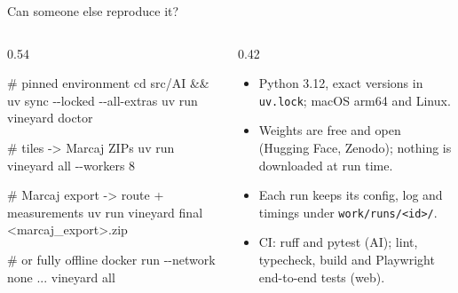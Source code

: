 \begin{frame}[fragile]{Can someone else reproduce it?}
  \begin{columns}[T]
    \begin{column}{0.54\textwidth}
\begin{semiverbatim}\scriptsize
\textcolor{sxGrey}{# pinned environment}
cd src/AI && uv sync -{}-locked -{}-all-extras
uv run vineyard doctor

\textcolor{sxGrey}{# tiles -> Marcaj ZIPs}
uv run vineyard all -{}-workers 8

\textcolor{sxGrey}{# Marcaj export -> route + measurements}
uv run vineyard final <marcaj_export>.zip

\textcolor{sxGrey}{# or fully offline}
docker run -{}-network none ... vineyard all
\end{semiverbatim}
    \end{column}
    \begin{column}{0.42\textwidth}
      \footnotesize
      \begin{itemize}\setlength{\itemsep}{1.2mm}
        \item Python 3.12, exact versions in \texttt{uv.lock}; macOS arm64 and Linux.
        \item Weights are free and open (Hugging Face, Zenodo); nothing is downloaded at run time.
        \item Each run keeps its config, log and timings under \texttt{work/runs/<id>/}.
        \item CI: ruff and pytest (AI); lint, typecheck, build and Playwright end-to-end tests (web).
      \end{itemize}
    \end{column}
  \end{columns}
\end{frame}

